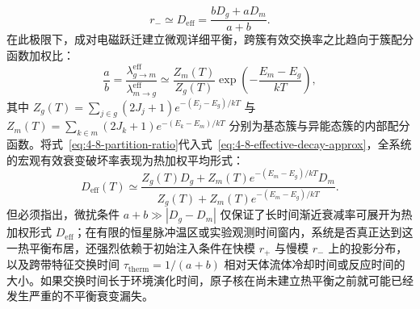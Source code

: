\begin{enumerate}
\begin{equation}\label{eq:4-8-effective-decay-approx}
r_- \simeq D_{\mathrm{eff}} = \frac{b D_g + a D_m}{a + b}.
\end{equation}
在此极限下，成对电磁跃迁建立微观详细平衡，跨簇有效交换率之比趋向于簇配分函数加权比：
\begin{equation}\label{eq:4-8-partition-ratio}
\frac{a}{b} = \frac{\lambda_{g \to m}^{\mathrm{eff}}}{\lambda_{m \to g}^{\mathrm{eff}}} \simeq \frac{Z_m(T)}{Z_g(T)} \exp\left(-\frac{E_m - E_g}{kT}\right),
\end{equation}
其中 $Z_g(T) = \sum_{j \in g} (2J_j + 1) e^{-(E_j - E_g)/kT}$ 与 $Z_m(T) = \sum_{k \in m} (2J_k + 1) e^{-(E_k - E_m)/kT}$ 分别为基态簇与异能态簇的内部配分函数。将式~\eqref{eq:4-8-partition-ratio}代入式~\eqref{eq:4-8-effective-decay-approx}，全系统的宏观有效衰变破坏率表现为热加权平均形式：
\begin{equation}\label{eq:4-8-therm-decay-average}
D_{\mathrm{eff}}(T) \simeq \frac{Z_g(T) D_g + Z_m(T) e^{-(E_m - E_g)/kT} D_m}{Z_g(T) + Z_m(T) e^{-(E_m - E_g)/kT}}.
\end{equation}
但必须指出，微扰条件 $a + b \gg |D_g - D_m|$ 仅保证了长时间渐近衰减率可展开为热加权形式 $D_{\mathrm{eff}}$；在有限的恒星脉冲温区或实验观测时间窗内，系统是否真正达到这一热平衡布居，还强烈依赖于初始注入条件在快模 $r_+$ 与慢模 $r_-$ 上的投影分布，以及跨带特征交换时间 $\tau_{\mathrm{therm}} = 1/(a+b)$ 相对天体流体冷却时间或反应时间的大小。如果交换时间长于环境演化时间，原子核在尚未建立热平衡之前就可能已经发生严重的不平衡衰变漏失。
\end{enumerate}

